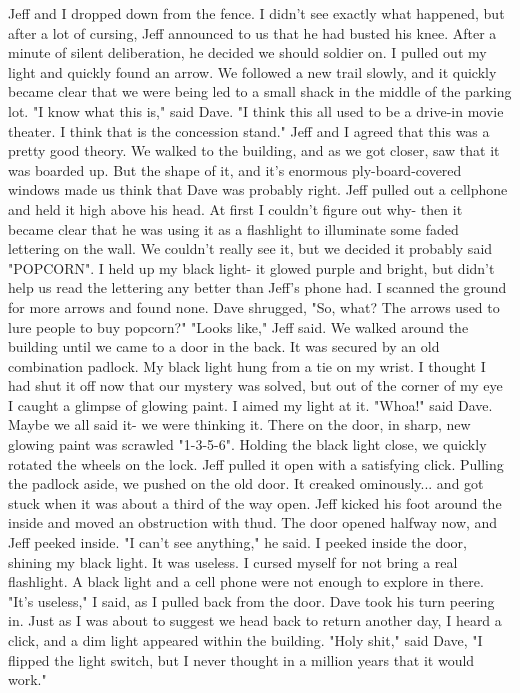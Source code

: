 \documentclass[a4paper]{article}
\begin{document}
Jeff and I dropped down from the fence. I didn't see exactly what happened, but after a lot of cursing, Jeff announced to us that he had busted his knee. After a minute of silent deliberation, he decided we should soldier on.
I pulled out my light and quickly found an arrow.
We followed a new trail slowly, and it quickly became clear that we were being led to a small shack in the middle of the parking lot.
"I know what this is," said Dave. "I think this all used to be a drive-in movie theater. I think that is the concession stand."
Jeff and I agreed that this was a pretty good theory.
We walked to the building, and as we got closer, saw that it was boarded up. But the shape of it, and it's enormous ply-board-covered windows made us think that Dave was probably right.
Jeff pulled out a cellphone and held it high above his head. At first I couldn't figure out why- then it became clear that he was using it as a flashlight to illuminate some faded lettering on the wall. We couldn't really see it, but we decided it probably said "POPCORN".
I held up my black light- it glowed purple and bright, but didn't help us read the lettering any better than Jeff's phone had. I scanned the ground for more arrows and found none.
Dave shrugged, "So, what? The arrows used to lure people to buy popcorn?"
"Looks like," Jeff said.
We walked around the building until we came to a door in the back. It was secured by an old combination padlock. My black light hung from a tie on my wrist. I thought I had shut it off now that our mystery was solved, but out of the corner of my eye I caught a glimpse of glowing paint.
I aimed my light at it.
"Whoa!" said Dave. Maybe we all said it- we were thinking it.
There on the door, in sharp, new glowing paint was scrawled "1-3-5-6".
Holding the black light close, we quickly rotated the wheels on the lock. Jeff pulled it open with a satisfying click.
Pulling the padlock aside, we pushed on the old door. It creaked ominously... and got stuck when it was about a third of the way open.
Jeff kicked his foot around the inside and moved an obstruction with thud. The door opened halfway now, and Jeff peeked inside.
"I can't see anything," he said.
I peeked inside the door, shining my black light. It was useless. I cursed myself for not bring a real flashlight. A black light and a cell phone were not enough to explore in there.
"It's useless," I said, as I pulled back from the door.
Dave took his turn peering in. Just as I was about to suggest we head back to return another day, I heard a click, and a dim light appeared within the building.
"Holy shit," said Dave, "I flipped the light switch, but I never thought in a million years that it would work."
\end{document}
